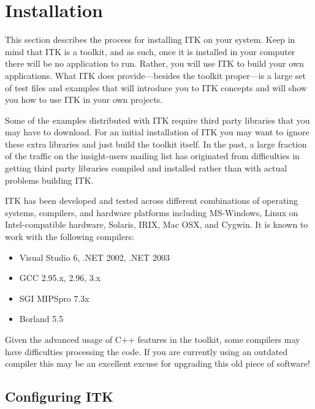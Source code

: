 \chapter{Installation}
\label{chapter:Installation}


This section describes the process for installing ITK on your system. Keep in
mind that ITK is a toolkit, and as such, once it is installed in your computer
there will be no application to run. Rather, you will use ITK to build your
own applications. What ITK does provide---besides the toolkit proper---is a
large set of test files and examples that will introduce you to ITK concepts
and will show you how to use ITK in your own projects.

Some of the examples distributed with ITK require third party libraries that
you may have to download. For an initial installation of ITK you may want to
ignore these extra libraries and just build the toolkit itself. In the past,
a large fraction of the traffic on the insight-users mailing list has
originated from
difficulties in getting third party libraries compiled and installed rather
than with actual problems building ITK.

ITK has been developed and tested across different combinations of
operating systems, compilers, and hardware platforms including
MS-Windows, Linux on Intel-compatible hardware, Solaris, IRIX, Mac
OSX, and Cygwin.  It is known to work with the following compilers:

\begin{itemize}
\item Visual Studio 6, .NET 2002, .NET 2003
\item GCC 2.95.x, 2.96, 3.x
\item SGI MIPSpro 7.3x
\item Borland 5.5
\end{itemize}

Given the advanced usage of C++ features in the toolkit, some
compilers may have difficulties processing the code. If you are
currently using an outdated compiler this may be an excellent excuse
for upgrading this old piece of software!

\section{Configuring ITK}
\label{sec:ConfiguringITK}

 
